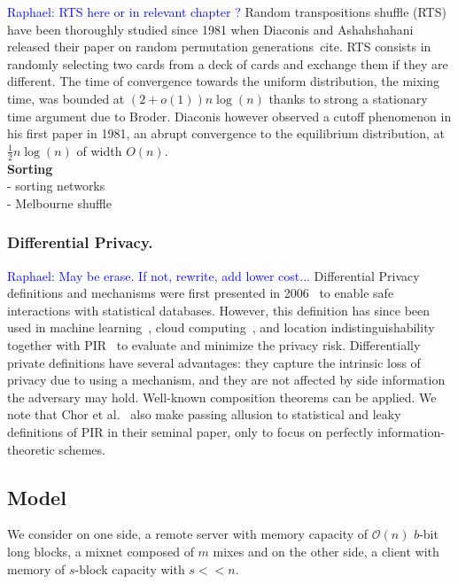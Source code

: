 \documentclass[conference]{IEEEtran}
\newcommand{\raphael}[1]{\textcolor{blue}{Raphael: #1}}
\begin{document}
\raphael{RTS here or in relevant chapter ?}
Random transpositions shuffle (RTS) have been thoroughly studied since 1981 when Diaconis and Ashahshahani released their paper on random permutation generations~cite{}.
RTS consists in randomly selecting two cards from a deck of cards and exchange them if they are different.
The time of convergence towards the uniform distribution, the mixing time, was bounded at $\left(2+o(1)\right)n\log(n)$ thanks to strong a stationary time argument due to Broder\cite{}.
Diaconis however observed a cutoff phenomenon in his first paper in 1981, an abrupt convergence to the equilibrium distribution, at $\frac{1}{2}n\log(n)$ of width $O(n)$.\\

\noindent\textbf{Sorting} \\
- sorting networks\\
- Melbourne shuffle\\

\subsubsection{Differential Privacy.}
\raphael{May be erase. If not, rewrite, add lower cost...}
Differential Privacy definitions and mechanisms were first presented in 2006~\cite{DiffPrivacy} to enable safe interactions with statistical databases.
However, this definition has since been used in machine learning~\cite{DeepLearning}, cloud computing~\cite{Airavat}, and location indistinguishability together with PIR~\cite{GeoIndis} to evaluate and minimize the privacy risk.
Differentially private definitions have several advantages: they capture the intrinsic loss of privacy due to using a mechanism, and they are not affected by side information the adversary may hold.
Well-known composition theorems can be applied. We note that Chor et al.~\cite{Chor} also make passing allusion to statistical and leaky definitions of PIR in their seminal paper, only to focus on perfectly information-theoretic schemes.


\subsection{Model}
We consider on one side, a remote server with memory capacity of $\mathcal{O}\left(n\right)$ $b$-bit long blocks, a mixnet composed of $m$ mixes and on the other side, a client with memory of $s$-block capacity with $s<<n$. 
\end{document}
